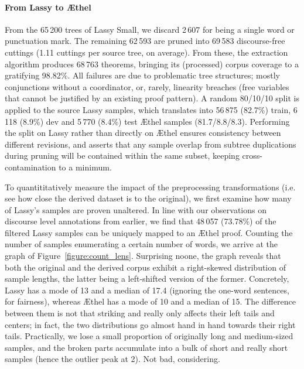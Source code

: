 \paragraph{From Lassy to \AE thel}
From the 65\,200 trees of Lassy Small, we discard 2\,607 for being a single word or punctuation mark.
The remaining 62\,593 are pruned into 69\,583 discourse-free cuttings (1.11 cuttings per source tree, on average).
From these, the extraction algorithm produces 68\,763 theorems, bringing its (processed) corpus coverage to a gratifying 98.82\%.
All failures are due to problematic tree structures; mostly conjunctions without a coordinator, or, rarely, linearity breaches (free variables that cannot be justified by an existing proof pattern).
A random 80/10/10 split is applied to the source Lassy samples, which translates into 56\,875 (82.7\%) train, 6\,118 (8.9\%) dev and 5\,770 (8.4\%) test \AE thel samples (81.7/8.8/8.3).
Performing the split on Lassy rather than directly on \AE thel ensures consistency between different revisions, and asserts that any sample overlap from subtree duplications during pruning will be contained within the same subset, keeping cross-contamination to a minimum.

To quantititatively measure the impact of the preprocessing transformations (i.e. see how close the derived dataset is to the original), we first examine how many of Lassy's samples are proven unaltered.
In line with our observations on discourse level annotations from earlier, we find that 48\,057 (73.78\%) of the filtered Lassy samples can be uniquely mapped to an \AE thel proof.
Counting the number of samples enumerating a certain number of words, we arrive at the graph of Figure~\ref{figure:count_lens}.
Surprising noone, the graph reveals that both the original and the derived corpus exhibit a right-skewed distribution of sample lengths, the latter being a left-shifted version of the former.
Concretely, Lassy has a mode of 13 and a median of 17.4 (ignoring the one-word sentences, for fairness), whereas \AE thel has a mode of 10 and a median of 15.
The difference between them is not that striking and really only affects their left tails and centers; in fact, the two distributions go almost hand in hand towards their right tails.
Practically, we lose a small proportion of originally long and medium-sized samples, and the broken parts accumulate into a bulk of short and really short samples (hence the outlier peak at 2).
Not bad, considering.


